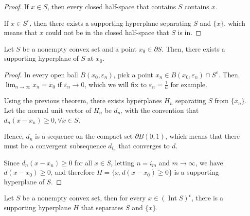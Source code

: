 \begin{proof}
  If \( x \in S \), then every closed half-space that contains \( S \) contains
  \( x \).

  If \( x \in S^{c} \), then there exists a supporting hyperplane separating \(
  S\) and \( \{x\}   \), which means that \( x \) could not be in the closed
  half-space that \( S \) is in.
\end{proof}


\begin{theorem}
  \label{thr:Supporting Hyperplane Theorem}
  Let \( S \) be a nonempty convex set and a point \( x_{0} \in \partial S \).
  Then, there exists a supporting hyperplane of \( S \) at \( x_{0} \).
\end{theorem}

\begin{proof}
  In every open ball \( B(x_{0}, \varepsilon_{n}) \), pick a point \( x_{n} \in
  B(x_{0}, \varepsilon_{n}) \cap  S^{c}\). Then, \( \lim_{n \to \infty} x_{n} =
  x_{0}\) if \( \varepsilon_{n} \to  0 \), which we will fix to \( \varepsilon_{n}
  = \frac{1}{n}\) for example.

  Using the previous theorem, there exists hyperplanes \( H_{n} \) separating \(
  S\) from \( \{x_{n}\}   \). Let the normal unit vector of \( H_{n} \) be \(
  d_{n} \), with the convention that \( d_{n}(x-x_{n}) \ge 0, \forall  x \in
  S \).

  Hence, \( d_{n} \) is a sequence on the compact set \( \partial B(0, 1) \),
  which means that there must be a convergent subsequence \( d_{i_{n}} \) that
  converges to \( d \).

  Since \( d_{n}(x-x_{n}) \ge 0 \) for all \( x \in S \), letting \( n = i_{m}
  \) and \( m \to  \infty \), we have \( d(x-x_{0}) \ge 0 \), and therefore \(
  H=\{x, d(x-x_{0})\ge 0\}   \) is a supporting hyperplane of \( S \).
\end{proof}

\begin{corollary}
\label{cor:hst-set-pt}
  Let \( S \) be a nonempty convex set, then for every \( x \in
  (\operatorname{Int} S)^{c} \), there is a supporting hyperplane \( H \) that
  separates \( S \) and \( \{ x\}   \).
\end{corollary}

